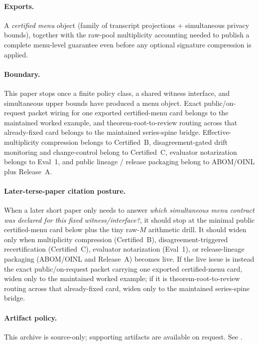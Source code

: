 \documentclass[11pt]{article}
\begin{document}
\paragraph{Exports.}
A \emph{certified menu} object (family of transcript projections + simultaneous privacy bounds), together with the raw-pool multiplicity accounting needed to publish a complete menu-level guarantee even before any optional signature compression is applied.

\paragraph{Boundary.}
This paper stops once a finite policy class, a shared witness interface, and simultaneous upper bounds have produced a menu object.
Exact public/on-request packet wiring for one exported certified-menu card belongs to the maintained worked example, and theorem-root-to-review routing across that already-fixed card belongs to the maintained series-spine bridge.
Effective-multiplicity compression belongs to Certified~B, disagreement-gated drift monitoring and change-control belong to Certified~C, evaluator notarization belongs to Eval~1, and public lineage / release packaging belong to ABOM/OINL plus Release~A.\cite{series:workedexample,series:seriesspines,series:sigcomp,series:recert,series:eval1,series:releaseA}

\paragraph{Later-terse-paper citation posture.}
When a later short paper only needs to answer \emph{which simultaneous menu contract was declared for this fixed witness/interface?}, it should stop at the minimal public certified-menu card below plus the tiny raw-$M$ arithmetic drill.
It should widen only when multiplicity compression (Certified~B), disagreement-triggered recertification (Certified~C), evaluator notarization (Eval~1), or release-lineage packaging (ABOM/OINL and Release~A) becomes live.
If the live issue is instead the exact public/on-request packet carrying one exported certified-menu card, widen only to the maintained worked example; if it is theorem-root-to-review routing across that already-fixed card, widen only to the maintained series-spine bridge.\cite{series:sigcomp,series:recert,series:eval1,series:abomoinl,series:releaseA,series:workedexample,series:seriesspines}

\paragraph{Artifact policy.}
This archive is source-only; supporting artifacts are available on request. See \cite{series:artifactpolicy}.
\end{document}
